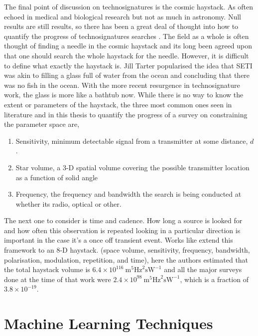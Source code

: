  The final point of discussion on technosignatures is the cosmic haystack. As often echoed in medical and biological research but not as much in astronomy. Null results are still results, so there has been a great deal of thought into how to quantify the progress of technosignatures searches \citep{Tarter:2003p266}. The field as a whole is often thought of finding a needle in the cosmic haystack and its long been agreed upon that one should search the whole haystack for the needle. However, it is difficult to define what exactly the haystack is. Jill Tarter popularised the idea that SETI was akin to filling a glass full of water from the ocean and concluding that there was no fish in the ocean. With the more recent resurgence in technosignature work, the glass is more like a bathtub now.  While there is no way to know the extent or parameters of the haystack, the three most common ones seen in literature and in this thesis to quantify the progress of a survey on constraining the parameter space are, 

 \begin{enumerate}
     \item Sensitivity, minimum detectable signal from a transmitter at some distance, $d$. 
     \item Star volume, a 3-D spatial volume covering the possible transmitter location as a function of solid angle
     \item Frequency, the frequency and bandwidth the search is being conducted at whether its radio, optical or other. 
 \end{enumerate}

 The next one to consider is time and cadence. How long a source is looked for and how often this observation is repeated looking in a particular direction is important in the case it's a once off transient event. Works like \cite{wkl18} extend this framework to an 8-D haystack. (space volume, sensitivity, frequency, bandwidth, polarisation, modulation, repetition, and time), here the authors estimated that the total haystack volume is $6.4 \times 10^{116}~\text{m}^5\text{Hz}^2\text{s}\text{W}^{-1}$ and all the major surveys done at the time of that work were $2.4 \times 10^{98}~\text{m}^5\text{Hz}^2\text{s}\text{W}^{-1}$, which is a fraction of $3.8\times 10^{-19}$.

\newpage
\section{Machine Learning Techniques}

